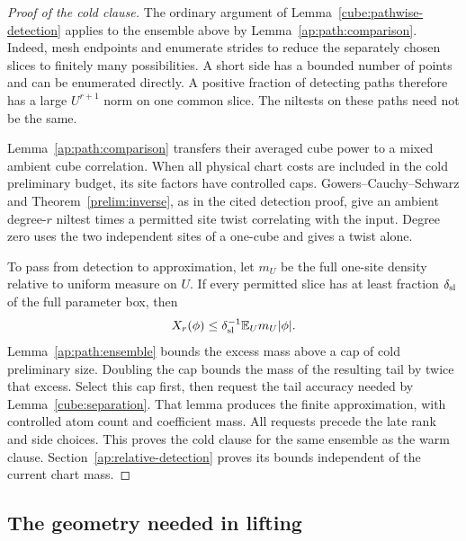 \begin{proof}[Proof of the cold clause]
The ordinary argument of Lemma~\ref{cube:pathwise-detection}
applies to the ensemble above by Lemma~\ref{ap:path:comparison}.  Indeed, mesh endpoints and enumerate strides to reduce
the separately chosen slices to finitely many possibilities.  A
short side has a bounded number of points and can be enumerated
directly.  A positive fraction of detecting paths therefore has
a large $U^{r+1}$ norm on one common slice.  The niltests on these
paths need not be the same.

Lemma~\ref{ap:path:comparison} transfers their averaged cube
power to a mixed ambient cube correlation.  When all physical
chart costs are included in the cold preliminary budget, its
site factors have controlled caps.  Gowers--Cauchy--Schwarz and
Theorem~\ref{prelim:inverse}, as in the cited detection proof,
give an ambient degree-$r$ niltest times a permitted site twist
correlating with the input.  Degree zero uses the two independent
sites of a one-cube and gives a twist alone.

To pass from detection to approximation, let $m_U$ be the full
one-site density relative to uniform measure on $U$.  If every
permitted slice has at least fraction $\delta_{\rm sl}$ of the
full parameter box, then
\[
              X_r(\phi)\le
       \delta_{\rm sl}^{-1}\mathbb E_U m_U|\phi|.
\]
Lemma~\ref{ap:path:ensemble} bounds the excess mass above a cap
of cold preliminary size.  Doubling the cap bounds the mass of
the resulting tail by twice that excess.  Select this cap first,
then request the tail accuracy needed by Lemma~\ref{cube:separation}.  That
lemma produces the finite approximation, with controlled atom
count and coefficient mass.  All requests precede the late
rank and side choices.  This proves the cold clause for the
same ensemble as the warm clause. Section~\ref{ap:relative-detection}
proves its bounds independent of the current chart mass.
\end{proof}

\subsection{The geometry needed in lifting}

